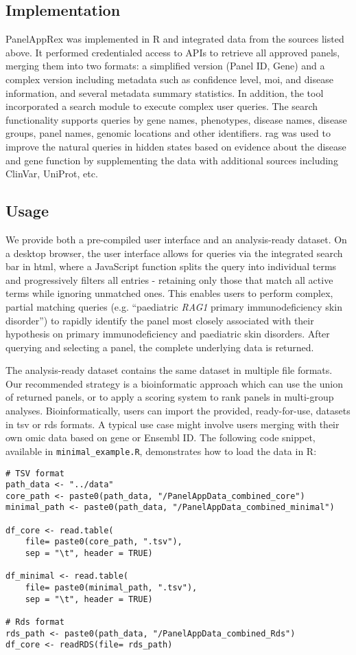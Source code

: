 \subsection{Implementation}
\noindent
PanelAppRex was implemented in R and integrated data from the sources listed above.
It performed credentialed access to APIs to retrieve all approved panels, merging them into two formats: a simplified version (Panel ID, Gene) and a complex version including metadata such as confidence level, \ac{moi}, and disease information, and several metadata summary statistics. In addition, the tool incorporated a search module to execute complex user queries. The search functionality supports queries by gene names, phenotypes, disease names, disease groups, panel names, genomic locations and other identifiers. 
\ac{rag} was used to improve the natural queries in hidden states based on evidence about the disease and gene function by supplementing the data with additional sources including ClinVar, UniProt, etc. 

\subsection{Usage}
\noindent
We provide both a pre-compiled user interface and an analysis-ready dataset.
On a desktop browser, the user interface allows for queries via the integrated search bar in \ac{html}, where a JavaScript function splits the query into individual terms and progressively filters all entries - retaining only those that match all active terms while ignoring unmatched ones. This enables users to perform complex, partial matching queries (e.g. ``paediatric \textit{RAG1} primary immunodeficiency skin disorder'') to rapidly identify the panel most closely associated with their hypothesis on primary immunodeficiency and paediatric skin disorders.
After querying and selecting a panel, the complete underlying data is returned.

The analysis-ready dataset contains the same dataset in multiple file formats.
Our recommended strategy is a bioinformatic approach which can use the union of returned panels, or to apply a scoring system to rank panels in multi-group analyses.
Bioinformatically, users can import the provided, ready-for-use, datasets in \ac{tsv} or \ac{rds} formats.
A typical use case might involve users merging with their own omic data based on gene or Ensembl ID.
The following code snippet, available in \texttt{minimal\_example.R}, demonstrates how to load the data in R:
\begin{verbatim}
# TSV format
path_data <- "../data"
core_path <- paste0(path_data, "/PanelAppData_combined_core")
minimal_path <- paste0(path_data, "/PanelAppData_combined_minimal")

df_core <- read.table(
    file= paste0(core_path, ".tsv"), 
    sep = "\t", header = TRUE)

df_minimal <- read.table(
    file= paste0(minimal_path, ".tsv"), 
    sep = "\t", header = TRUE)

# Rds format
rds_path <- paste0(path_data, "/PanelAppData_combined_Rds")
df_core <- readRDS(file= rds_path)
\end{verbatim}

